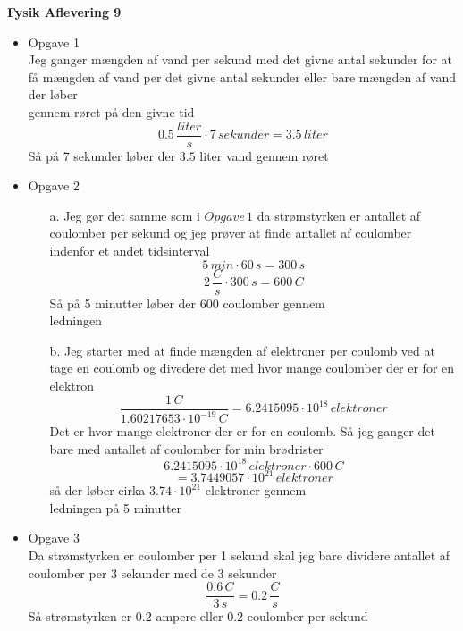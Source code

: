 \documentclass[12pt]{article}
\begin{document}
\Large{\textbf{Fysik Aflevering 9}}
\normalsize
\begin{itemize}
  \item {Opgave 1}\\
  Jeg ganger mængden af vand per sekund med det givne antal sekunder for at få mængden af vand per det givne antal sekunder eller bare mængden af vand der løber\\ gennem røret på den givne tid\\
  $$
  0.5\, \frac{liter}{s} \cdot 7\, sekunder = 3.5\, liter
  $$
  Så på 7 sekunder løber der $3.5$ liter vand gennem røret\\

  \item {Opgave 2}
  \begin{enumerate}
    \item[a.] Jeg gør det samme som i $Opgave\, 1$ da strømstyrken er antallet af coulomber per sekund og jeg prøver at finde antallet af coulomber indenfor et andet tidsinterval\\
    $$
    5\, min \cdot 60\, s = 300\, s
    $$
    $$
    2\, \frac{C}{s} \cdot 300\, s = 600\, C
    $$
    Så på 5 minutter løber der $600$ coulomber gennem\\ ledningen\\

    \item[b.] Jeg starter med at finde mængden af elektroner per coulomb ved at tage en coulomb og divedere det med hvor mange coulomber der er for en elektron\\
    $$
    \frac{1\, C}{1.60217653 \cdot 10^{-19}\, C} = 6.2415095 \cdot 10^{18}\, elektroner
    $$
    Det er hvor mange elektroner der er for en coulomb. Så jeg ganger det bare med antallet af coulomber for min brødrister\\
    $$
    6.2415095 \cdot 10^{18}\, elektroner \cdot 600\, C
    $$
    $$
    = 3.7449057 \cdot 10^{21}\, elektroner
    $$
    så der løber cirka $3.74 \cdot 10^{21}$ elektroner gennem\\ ledningen på 5 minutter\\
  \end{enumerate}

  \item{Opgave 3}\\
  Da strømstyrken er coulomber per 1 sekund skal jeg bare dividere antallet af coulomber per 3 sekunder med de 3 sekunder
  $$
  \frac{0.6\, C}{3\, s} = 0.2\, \frac{C}{s}
  $$
  Så strømstyrken er $0.2$ ampere eller $0.2$ coulomber per sekund\\


\end{itemize}
\end{document}
